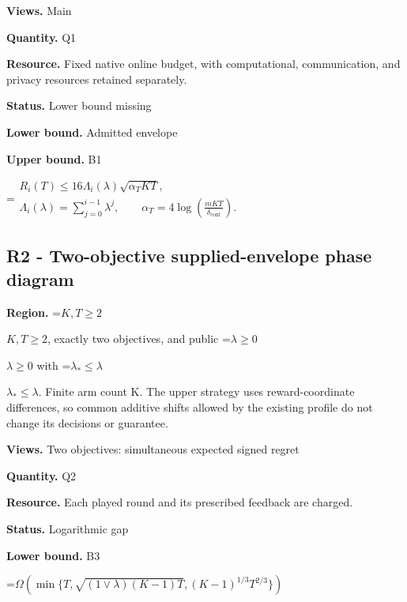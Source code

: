 \documentclass[10pt,a4paper]{article}
\newcommand{\AtlasMath}[1]{\par\begingroup\centering\setbox0=\hbox{$\displaystyle #1$}\ifdim\wd0>1.4\linewidth\typeout{ATLAS WIDE FORMULA: \the\wd0}\fi\ifdim\wd0>\linewidth\resizebox{\linewidth}{!}{\box0}\else\box0\fi\par\endgroup}
\newcommand{\AtlasInlineMath}[1]{\begingroup\setbox0=\hbox{$#1$}\ifdim\wd0>.4\linewidth\endgroup\AtlasMath{#1}\else\endgroup$#1$\fi}
\begin{document}
\textbf{Views.} Main



\textbf{Quantity.} Q1



\textbf{Resource.} Fixed native online budget, with computational, communication, and privacy resources retained separately.



\textbf{Status.} Lower bound missing



\textbf{Lower bound.} Admitted envelope



\textbf{Upper bound.} B1



\AtlasMath{\begin{gathered}R_i(T)\le16\Lambda_i(\lambda)\sqrt{\alpha_TKT},\\ \Lambda_i(\lambda)=\sum_{j=0}^{i-1}\lambda^j,\qquad \alpha_T=4\log\!\left(\frac{mKT}{\delta_{\mathrm{conf}}}\right).\end{gathered}}


\subsection{R2 - Two-objective supplied-envelope phase diagram}


\textbf{Region.} \AtlasInlineMath{K,T\ge2}, exactly two objectives, and public \AtlasInlineMath{\lambda\ge0} with \AtlasInlineMath{\lambda_*\le\lambda}. Finite arm count K. The upper strategy uses reward-coordinate differences, so common additive shifts allowed by the existing profile do not change its decisions or guarantee.



\textbf{Views.} Two objectives: simultaneous expected signed regret



\textbf{Quantity.} Q2



\textbf{Resource.} Each played round and its prescribed feedback are charged.



\textbf{Status.} Logarithmic gap



\textbf{Lower bound.} B3



\AtlasMath{\Omega\!\left(\min\{T,\sqrt{(1\vee\lambda)(K-1)T},(K-1)^{1/3}T^{2/3}\}\right)}
\end{document}
